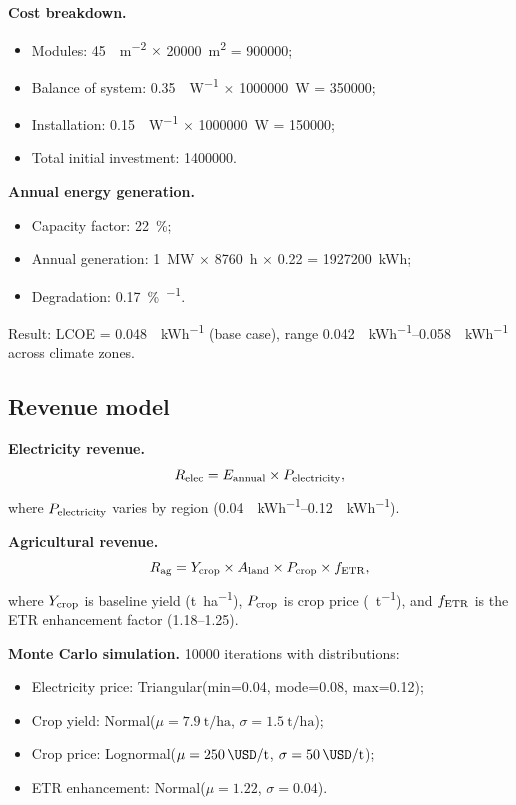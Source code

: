 \documentclass[11pt,a4paper]{article}
\begin{document}
\textbf{Cost breakdown.}
\begin{itemize}
    \item Modules: \SI{45}{\USD\per\meter\squared} $\times$ \SI{20000}{\meter\squared} = \SI{900000}{\USD};
    \item Balance of system: \SI{0.35}{\USD\per\watt} $\times$ \SI{1000000}{\watt} = \SI{350000}{\USD};
    \item Installation: \SI{0.15}{\USD\per\watt} $\times$ \SI{1000000}{\watt} = \SI{150000}{\USD};
    \item Total initial investment: \SI{1400000}{\USD}.
\end{itemize}

\textbf{Annual energy generation.}
\begin{itemize}
    \item Capacity factor: \SI{22}{\percent};
    \item Annual generation: \SI{1}{\mega\watt} $\times$ \SI{8760}{\hour} $\times$ 0.22 = \SI{1927200}{\kWh};
    \item Degradation: \SI{0.17}{\percent\per\yr}.
\end{itemize}

Result: LCOE = \SI{0.048}{\USD\per\kWh} (base case), range \SIrange{0.042}{0.058}{\USD\per\kWh} across climate zones.

\subsection{Revenue model}

\textbf{Electricity revenue.}
\begin{equation}
R_{\rm elec} = E_{\rm annual} \times P_{\rm electricity},
\end{equation}
where $P_{\rm electricity}$ varies by region (\SIrange{0.04}{0.12}{\USD\per\kWh}).

\textbf{Agricultural revenue.}
\begin{equation}
R_{\rm ag} = Y_{\rm crop} \times A_{\rm land} \times P_{\rm crop} \times f_{\rm ETR},
\end{equation}
where $Y_{\rm crop}$ is baseline yield (\si{\tonne\per\hectare}), $P_{\rm crop}$ is crop price (\si{\USD\per\tonne}), and $f_{\rm ETR}$ is the ETR enhancement factor (\numrange{1.18}{1.25}).

\textbf{Monte Carlo simulation.} \num{10000} iterations with distributions:
\begin{itemize}
    \item Electricity price: Triangular(min=\SI{0.04}{\USD}, mode=\SI{0.08}{\USD}, max=\SI{0.12}{\USD});
    \item Crop yield: Normal($\mu = \SI{7.9}{\tonne\per\hectare}$, $\sigma = \SI{1.5}{\tonne\per\hectare}$);
    \item Crop price: Lognormal($\mu = \SI{250}{\USD\per\tonne}$, $\sigma = \SI{50}{\USD\per\tonne}$);
    \item ETR enhancement: Normal($\mu = 1.22$, $\sigma = 0.04$).
\end{itemize}
\end{document}
